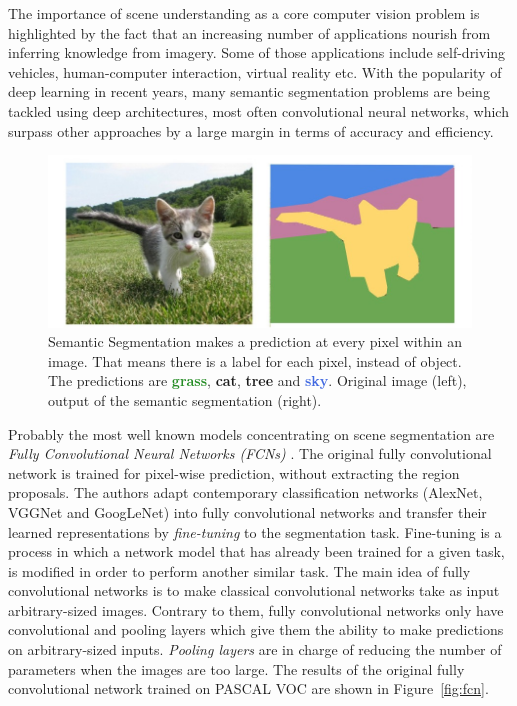 \documentclass[12pt,a4paper,table,dvipsnames,tikz]{report}
\newcommand{\term}{\textit}
\newcommand{\acronym}{\MakeUppercase}
\newcommand{\bl}[1]{{\hypersetup{linkcolor=blue}#1}}
\newcommand{\boldcolor}[2]{\textbf{\textcolor{#1}{#2}}}
\begin{document}
	The importance of scene understanding as a core computer vision problem is 
	highlighted by the fact that an increasing number of applications nourish from inferring 
	knowledge from imagery. Some of those applications include self-driving vehicles, 
	human-computer interaction, virtual reality etc. With the popularity of deep learning 
	in recent years, many semantic segmentation problems are being tackled using deep 
	architectures, most often convolutional neural networks, which surpass other 
	approaches by a large margin in terms of accuracy and efficiency.
	\\
	
	\begin{figure}[h!]
		\centering
		\includegraphics[width=\textwidth]{segm}
		\caption{Semantic Segmentation makes a prediction at every pixel within an image. 
			That means there is a label for each pixel, instead of object. The predictions 
			are \boldcolor{ForestGreen}{grass}, \boldcolor{YellowOrange}{cat}, 
			\boldcolor{VioletRed}{tree} and \boldcolor{RoyalBlue}{sky}. 
			Original image (left), output of the semantic segmentation (right).}
		\label{fig:segm}
	\end{figure}
	
	
	Probably the most well known models concentrating on scene segmentation are 
	\term{Fully Convolutional Neural Networks (\acronym{fcn}s)} \citep{Long}. The original 
	fully convolutional network is trained for pixel-wise prediction, without extracting 
	the region proposals. The authors adapt contemporary classification networks (AlexNet,
	VGGNet and GoogLeNet) into fully convolutional networks and transfer their learned 
	representations by \term{fine-tuning} to the segmentation task. Fine-tuning is a 
	process in which a network model that has already been trained for a given task, is 
	modified in order to perform another similar task. The main idea of fully convolutional 
	networks is to make classical convolutional networks take as input arbitrary-sized 
	images. Contrary to them, fully convolutional networks only have convolutional and 
	pooling layers which give them the ability to make predictions on arbitrary-sized inputs. 
	\term{Pooling layers} are in charge of reducing the number of parameters when the images 
	are too large. The results of the original fully convolutional network trained on 
	\acronym{pascal voc} are shown in Figure~\bl{\ref{fig:fcn}}.
	\\
	
\end{document}
